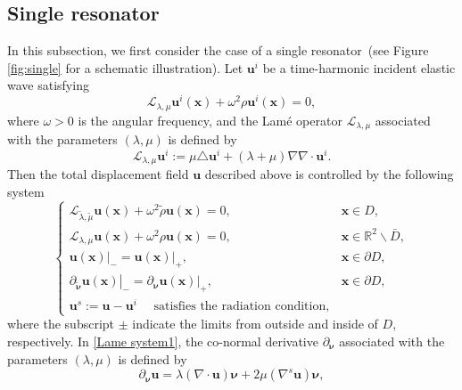 \documentclass[10pt,reqno,oneside]{amsart}%
\theoremstyle{definition}
\theoremstyle{remark}
\numberwithin{equation}{section}
\numberwithin{equation}{section}
\begin{document}
\subsection{Single resonator}In this subsection, we first consider the case of a single resonator~(see Figure \ref{fig:single} for a schematic illustration). Let $\mathbf{u}^{i}$ be a time-harmonic incident elastic wave satisfying %
\begin{equation}\label{Lame operator}
\mathcal{L}_{\lambda, \mu} \mathbf{u}^{i}(\mathbf{x})+\omega^{2} \rho \mathbf{u}^{i}(\mathbf{x})=0,
\end{equation}
where $\omega>0$ is the angular frequency, and the Lam\'e operator $\mathcal{L}_{\lambda, \mu}$ associated with the parameters $(\lambda, \mu)$ is defined by
\begin{equation}\label{Lame definition}
\mathcal{L}_{\lambda, \mu} \mathbf{u}^{i}:=\mu \triangle \mathbf{u}^{i}+(\lambda+\mu) \nabla \nabla \cdot \mathbf{u}^{i} .
\end{equation}
Then the total displacement field $\mathbf{u}$ described above is controlled by the following system
\begin{equation}\label{Lame system1}
\begin{cases}
\mathcal{L}_{\tilde{\lambda}, \tilde{\mu}} \mathbf{u}(\mathbf{x})+\omega^{2} \tilde{\rho} \mathbf{u}(\mathbf{x})=0, & \mathbf{x} \in D , \\ \mathcal{L}_{\lambda, \mu} \mathbf{u}(\mathbf{x})+\omega^{2} \rho \mathbf{u}(\mathbf{x})=0, & \mathbf{x} \in \mathbb{R}^{2} \backslash \bar{D}, \\ \left.\mathbf{u}(\mathbf{x})\right|_{-}=\left.\mathbf{u}(\mathbf{x})\right|_{+}, & \mathbf{x} \in \partial D, \\ \left.\partial_{\tilde{\boldsymbol{\nu}}} \mathbf{u}(\mathbf{x})\right|_{-}=\left.\partial_{\boldsymbol{\nu}} \mathbf{u}(\mathbf{x})\right|_{+}, & \mathbf{x} \in \partial D ,\\
\mathbf{u}^{s}:=\mathbf{u}-\mathbf{u}^{i} \quad \text { satisfies the radiation condition}, &
\end{cases}
\end{equation}
where the subscript $\pm$ indicate the limits from outside and inside of $D$, respectively. In \eqref{Lame system1}, the co-normal derivative $\partial_{\boldsymbol{\nu}}$ associated with the parameters $(\lambda, \mu)$ is defined by
\begin{equation}\label{co-normal derivative}
\partial_{\boldsymbol{\nu}} \mathbf{u}=\lambda(\nabla \cdot \mathbf{u}) \boldsymbol{\nu}+2 \mu\left(\nabla^{s} \mathbf{u}\right) \boldsymbol{\nu},
\end{equation}
\end{document}
